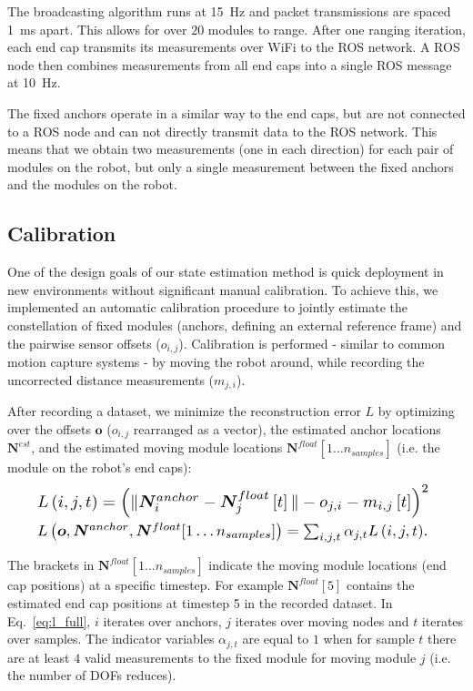 {The broadcasting algorithm runs at \SI{15}{\hertz} and packet transmissions are spaced \SI{1}{\milli\second} apart.
This allows for over $20$ modules to range.
After one ranging iteration, each end cap transmits its measurements over WiFi to the ROS network. 
A ROS node then combines measurements from all end caps into a single ROS message at  \SI{10}{\hertz}.

The fixed anchors operate in a similar way to the end caps, but are not connected to a ROS node and can not directly transmit data to the ROS network.
This means that we obtain two measurements (one in each direction) for each pair of modules on the robot, 
but only a single measurement between the fixed anchors and the modules on the robot.


\subsection{Calibration}
\label{txt:calib}
One of the design goals of our state estimation method is quick deployment in new environments without significant manual calibration.
To achieve this, we implemented an automatic calibration procedure to jointly estimate the constellation of fixed modules (anchors, defining an external reference frame) 
and the pairwise sensor offsets ($o_{i,j}$).
Calibration is performed - similar to common motion capture systems - by moving the robot around, while recording the uncorrected distance measurements ($m_{j,i}$).

After recording a dataset, we minimize the reconstruction error $L$ by optimizing over the offsets $\bm{o}$ ($o_{i,j}$ rearranged as a vector), the estimated anchor locations $\bm{N}^{est}$, and the estimated moving module locations $\bm{N}^{float}[1\ldots n_{samples}]$ (i.e. the module on the robot's end caps):
\begin{align}
\resizebox{.91\hsize}{!}{$L\left(i,j,t\right) = \left( \|\bm{N}^{anchor}_i - \bm{N}^{float}_{j}\left[t\right]\|-o_{j,i} - m_{i,j}\left[t\right] \right)^2$ \label{eq:l_single}}\\
\resizebox{.91\hsize}{!}{$L\left(\bm{o},\bm{N}^{anchor},\bm{N}^{float}[1\ldots n_{samples}]\right) = \sum_{i,j,t}\alpha_{j,t}L\left(i,j,t\right)$. \label{eq:l_full}}
\end{align}

The brackets in $\bm{N}^{float}[1\ldots n_{samples}]$ indicate the moving module locations (end cap positions) at a specific timestep. 
For example $\bm{N}^{float}[5]$ contains the estimated end cap positions at timestep 5 in the recorded dataset.
In Eq.~\ref{eq:l_full}, $i$ iterates over anchors, $j$ iterates over moving nodes and $t$ iterates over samples.
The indicator variables $\alpha_{j,t}$ are equal to $1$ when for sample $t$ there are at least $4$ valid measurements to the fixed module for moving module $j$ (i.e. the number of DOFs reduces).

}
